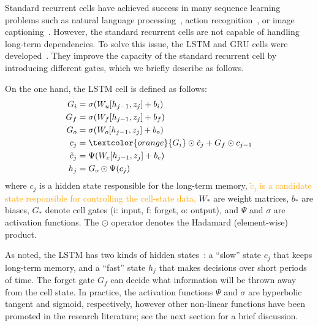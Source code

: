 \documentclass[sn-mathphys, pdflatex]{sn-jnl}
\newcommand{\rev}[1]{\textcolor{orange}{#1}}
\begin{document}
Standard recurrent cells have achieved success in many sequence learning problems
such as natural language processing~\cite{Sutskever14}, action recognition~\cite{Du18}, or image captioning~\cite{Mao15}.
However, the standard recurrent cells are not capable of handling long-term dependencies.
To solve this issue, the LSTM and GRU cells were developed~\cite{Hochreiter97_lstm, Cho14_gru}.
They improve the capacity of the standard recurrent cell by introducing different gates,
which we briefly describe as follows.

On the one hand, the LSTM cell is defined as follows:
\begin{align}
        G_i &= \sigma(W_u [ h_{j-1}, z_j ] + b_i) \\
        G_f &= \sigma(W_f [ h_{j-1}, z_j ] + b_f) \\
        G_o &= \sigma(W_o [ h_{j-1}, z_j ] + b_o) \\
        c_j &= \rev{G_i} \odot \tilde{c}_j + G_f \odot c_{j-1} \\
\tilde{c}_j &= \Psi(W_c [ h_{j-1}, z_j ] + b_c) \\
        h_j &= G_o \odot \Psi(c_j)
\end{align}
where
$c_j$ is a hidden state responsible for the long-term memory,
\rev{$\tilde{c}_j$ is a candidate state responsible for controlling the cell-state data,}
$W_*$ are weight matrices,
$b_*$ are biases,
$G_*$ denote cell gates (i: input, f: forget, o: output),
and $\Psi$ and $\sigma$ are activation functions.
The $\odot$ operator denotes the Hadamard (element-wise) product.

As noted, the LSTM has two kinds of hidden states~\cite{Jozefowicz15}:
a ``slow'' state $c_j$ that keeps long-term memory,
and a ``fast'' state $h_j$ that makes decisions over short periods of time.
The forget gate $G_f$ can decide what information will be thrown away from the cell state.
In practice, the activation functions $\Psi$ and $\sigma$ are hyperbolic tangent and sigmoid, respectively,
however other non-linear functions have been promoted in the research literature;
see the next section for a brief discussion.
\end{document}
